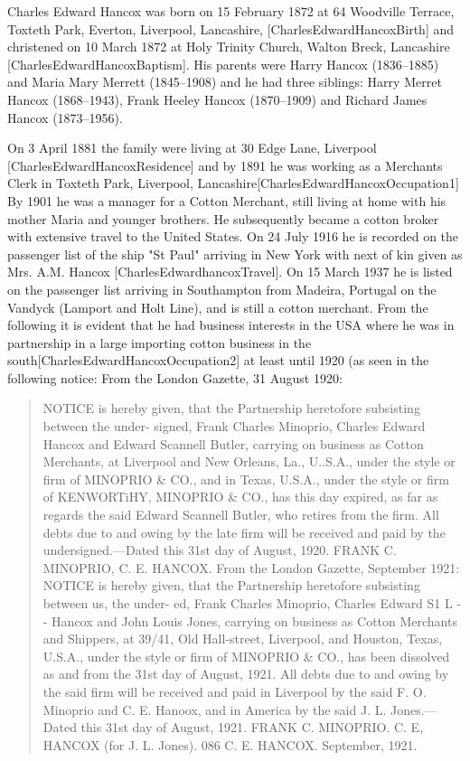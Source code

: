 
Charles Edward Hancox was born on 15 February 1872 at 64 Woodville Terrace, Toxteth Park, Everton, Liverpool, Lancashire, [CharlesEdwardHancoxBirth] and christened on 10 March 1872 at Holy Trinity Church, Walton Breck, Lancashire [CharlesEdwardHancoxBaptism]. His parents were Harry Hancox (1836--1885) and Maria Mary Merrett (1845--1908) and he had three siblings: Harry Merret Hancox (1868--1943), Frank Heeley Hancox (1870--1909) and Richard James Hancox (1873--1956).


On 3 April 1881 the family were living at 30 Edge Lane, Liverpool [CharlesEdwardHancoxResidence] and by 1891 he was working as a Merchants Clerk in Toxteth Park, Liverpool, Lancashire[CharlesEdwardHancoxOccupation1]
By 1901 he was a manager for a Cotton Merchant, still living at home with his mother Maria and younger brothers. He subsequently became a cotton broker with extensive travel to the United States.  On 24 July 1916 he is recorded on the passenger list of the ship "St Paul" arriving in New York with next of kin given as Mrs. A.M. Hancox [CharlesEdwardhancoxTravel]. On 15 March 1937 he is listed on the passenger list arriving in Southampton from Madeira, Portugal on the Vandyck (Lamport and Holt Line), and is still a cotton merchant. From the following it is evident that he had business interests in the USA where he was in partnership in a large importing cotton business in the south[CharlesEdwardHancoxOccupation2] at least until 1920 (as seen in the following notice:
From the London Gazette, 31 August 1920:

\begin{quotation}
NOTICE is hereby given, that the Partnership heretofore subsisting between the under- signed, Frank Charles Minoprio, Charles Edward Hancox and Edward Scannell Butler, carrying on business as Cotton Merchants, at Liverpool and New Orleans, La., U..S.A., under the style or firm of MINOPRIO \& CO., and in Texas, U.S.A., under the style or firm of KENWORTiHY, MINOPRIO \& CO., has this day expired, as far as regards the said Edward Scannell Butler, who retires from the firm. All debts due to and owing by the late firm will be received and paid by the undersigned.—Dated this 31st day of August, 1920. FRANK C. MINOPRIO, C. E. HANCOX. From the London Gazette, September 1921: NOTICE is hereby given, that the Partnership heretofore subsisting between us, the under- ed, Frank Charles Minoprio, Charles Edward S1 L - - Hancox and John Louis Jones, carrying on business as Cotton Merchants and Shippers, at 39/41, Old Hall-street, Liverpool, and Houston, Texas, U.S.A., under the style or firm of MINOPRIO \& CO., has been dissolved as and from the 31st day of August, 1921. All debts due to and owing by the said firm will be received and paid in Liverpool by the said F. O. Minoprio and C. E. Hanoox, and in America by the said J. L. Jones.—Dated this 31st day of August, 1921. FRANK C. MINOPRIO. C. E, HANCOX (for J. L. Jones). 086 C. E. HANCOX. September, 1921.
\end{quotation}

